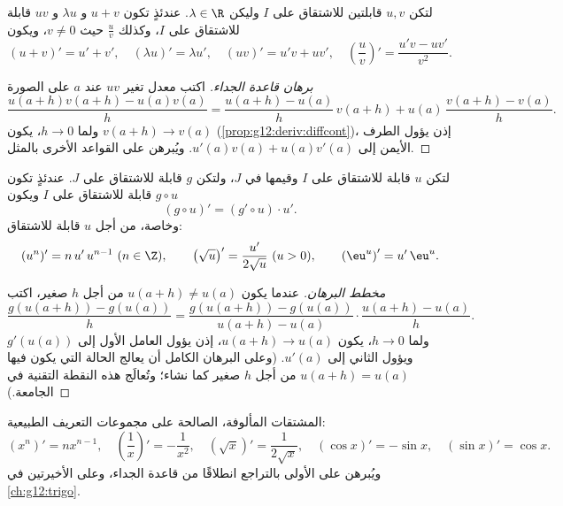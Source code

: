 \begin{proposition}[العمليات]\label{prop:g12:deriv:operations}
لتكن $u, v$ قابلتين للاشتقاق على $I$ وليكن $\lambda \in \R$. عندئذٍ تكون $u + v$
و $\lambda u$ و $uv$ قابلة للاشتقاق على $I$، وكذلك $\frac{u}{v}$ حيث
$v \neq 0$، ويكون
\[
(u+v)' = u' + v', \quad (\lambda u)' = \lambda u', \quad
(uv)' = u'v + uv', \quad
\left(\frac{u}{v}\right)' = \frac{u'v - uv'}{v^2}.
\]
\end{proposition}

\begin{proof}[برهان قاعدة الجداء]
اكتب معدل تغير $uv$ عند $a$ على الصورة
\[
\frac{u(a+h)v(a+h) - u(a)v(a)}{h}
= \frac{u(a+h) - u(a)}{h}\,v(a+h) + u(a)\,\frac{v(a+h) - v(a)}{h}.
\]
ولما $h \to 0$، يكون $v(a+h) \to v(a)$ 
(\cref{prop:g12:deriv:diffcont})، إذن يؤول الطرف الأيمن إلى
$u'(a)v(a) + u(a)v'(a)$. ويُبرهن على القواعد الأخرى بالمثل.
\end{proof}

\begin{theorem}\label{thm:g12:deriv:chain}
لتكن $u$ قابلة للاشتقاق على $I$ وقيمها في $J$، ولتكن $g$ قابلة للاشتقاق
على $J$. عندئذٍ تكون $g \circ u$ قابلة للاشتقاق على $I$ ويكون
\[
(g \circ u)' = (g' \circ u) \cdot u' .
\]
وخاصة، من أجل $u$ قابلة للاشتقاق:
\[
(u^n)' = n\,u'\,u^{n-1} \ (n \in \Z), \qquad
\left(\sqrt{u}\right)' = \frac{u'}{2\sqrt{u}} \ (u > 0), \qquad
\left(\eu^{u}\right)' = u'\,\eu^{u}.
\]
\end{theorem}

\begin{proof}[مخطط البرهان]
عندما يكون $u(a+h) \neq u(a)$ من أجل $h$ صغير، اكتب
\[
\frac{g(u(a+h)) - g(u(a))}{h}
= \frac{g(u(a+h)) - g(u(a))}{u(a+h) - u(a)} \cdot \frac{u(a+h) - u(a)}{h}.
\]
ولما $h \to 0$، يكون $u(a+h) \to u(a)$، إذن يؤول العامل الأول إلى $g'(u(a))$
ويؤول الثاني إلى $u'(a)$. (وعلى البرهان الكامل أن يعالج الحالة التي يكون فيها
$u(a+h) = u(a)$ من أجل $h$ صغير كما نشاء؛ وتُعالَج هذه النقطة التقنية في
الجامعة.)
\end{proof}

\begin{example}
المشتقات المألوفة، الصالحة على مجموعات التعريف الطبيعية:
\[
(x^n)' = nx^{n-1}, \quad
\left(\frac{1}{x}\right)' = -\frac{1}{x^2}, \quad
(\sqrt{x})' = \frac{1}{2\sqrt{x}}, \quad
(\cos x)' = -\sin x, \quad
(\sin x)' = \cos x .
\]
ويُبرهن على الأولى بالتراجع انطلاقًا من قاعدة الجداء، وعلى الأخيرتين في
\cref{ch:g12:trigo}.
\end{example}

